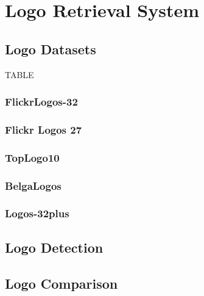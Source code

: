 \chapter{Logo Retrieval System}

\section{Logo Datasets}
TABLE
\subsection{FlickrLogos-32}
\subsection{Flickr Logos 27}
\subsection{TopLogo10}
\subsection{BelgaLogos}
\subsection{Logos-32plus}

\section{Logo Detection}

\section{Logo Comparison}
